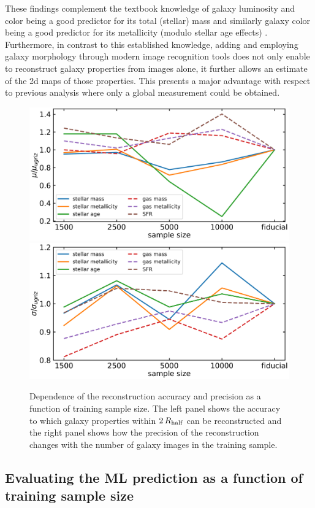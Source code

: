 \documentclass[conference]{IEEEtran}
\begin{document}
These findings complement the textbook knowledge of galaxy luminosity and color being a good predictor for its total (stellar) mass \citep[e.g.][]{Kauffmann2003} and similarly galaxy color being a good predictor for its metallicity (modulo stellar age effects) \citep[e.g.][]{Tremonti2004,Gallazzi2005}. Furthermore, in contrast to this established knowledge, adding and employing galaxy morphology through modern image recognition tools does not only enable to reconstruct galaxy properties from images alone, it further allows an estimate of the 2d maps of those properties. This presents a major advantage with respect to previous analysis where only a global measurement could be obtained.

\begin{figure}
\begin{center}
\includegraphics[width=.5\textwidth]{./plots/sample_comparison_mu.pdf}
\includegraphics[width=.4875\textwidth]{./plots/sample_comparison_sigma.pdf}
\end{center}
\vspace{-.35cm}
\caption{Dependence of the reconstruction accuracy and precision as a function of training sample size. The left panel shows the accuracy to which galaxy properties within $2\,R_{\rm half}$ can be reconstructed and the right panel shows how the precision of the reconstruction changes with the number of galaxy images in the training sample.}
\label{fig:sample_comp}
\end{figure}


\subsection{Evaluating the ML prediction as a function of training sample size}
\label{sec:sample_size}
\end{document}
